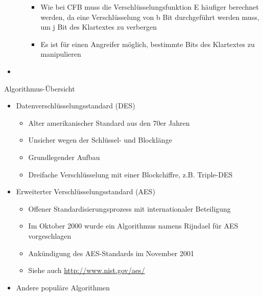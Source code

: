 \documentclass[a4paper]{article}
\begin{document}
\begin{multicols}{3}
\begin{itemize}
\begin{itemize}
                        \begin{itemize}
                            \item
                                  Wie bei CFB muss die Verschlüsselungsfunktion E häufiger berechnet
                                  werden, da eine Verschlüsselung von b Bit durchgeführt werden
                                  muss, um j Bit des Klartextes zu verbergen
                            \item
                                  Es ist für einen Angreifer möglich, bestimmte Bits des Klartextes
                                  zu manipulieren
                        \end{itemize}
              \end{itemize}
        \item
    \end{itemize}

    Algorithmus-Übersicht

    \begin{itemize}
        \item
              Datenverschlüsselungsstandard (DES)

              \begin{itemize}
                  \item
                        Alter amerikanischer Standard aus den 70er Jahren
                  \item
                        Unsicher wegen der Schlüssel- und Blocklänge
                  \item
                        Grundlegender Aufbau
                  \item
                        Dreifache Verschlüsselung mit einer Blockchiffre, z.B. Triple-DES
              \end{itemize}
        \item
              Erweiterter Verschlüsselungsstandard (AES)

              \begin{itemize}
                  \item
                        Offener Standardisierungsprozess mit internationaler Beteiligung
                  \item
                        Im Oktober 2000 wurde ein Algorithmus namens Rijndael für AES
                        vorgeschlagen
                  \item
                        Ankündigung des AES-Standards im November 2001
                  \item
                        Siehe auch \href{http://www.nist.gov/aes/}{http://www.nist.gov/aes/}
              \end{itemize}
        \item
              Andere populäre Algorithmen


\end{itemize}
\end{multicols}
\end{document}
